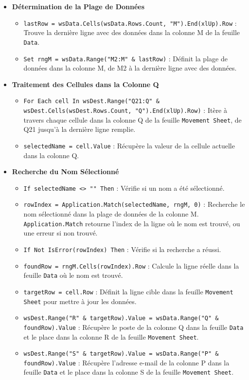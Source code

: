 \documentclass[a4paper, oneside, 12pt, final]{extreport}
\begin{document}
\begin{itemize}
    \item \textbf{Détermination de la Plage de Données}
    \begin{itemize}
        \item \texttt{lastRow = wsData.Cells(wsData.Rows.Count, "M").End(xlUp).Row} : Trouve la dernière ligne avec des données dans la colonne M de la feuille \texttt{Data}.
        \item \texttt{Set rngM = wsData.Range("M2:M" \& lastRow)} : Définit la plage de données dans la colonne M, de M2 à la dernière ligne avec des données.
    \end{itemize}

    \item \textbf{Traitement des Cellules dans la Colonne Q}
    \begin{itemize}
        \item \texttt{For Each cell In wsDest.Range("Q21:Q" \& wsDest.Cells(wsDest.Rows.Count, "Q").End(xlUp).Row)} : Itère à travers chaque cellule dans la colonne Q de la feuille \texttt{Movement Sheet}, de Q21 jusqu'à la dernière ligne remplie.
        \item \texttt{selectedName = cell.Value} : Récupère la valeur de la cellule actuelle dans la colonne Q.
    \end{itemize}

    \item \textbf{Recherche du Nom Sélectionné}
    \begin{itemize}
        \item \texttt{If selectedName <> "" Then} : Vérifie si un nom a été sélectionné.
        \item \texttt{rowIndex = Application.Match(selectedName, rngM, 0)} : Recherche le nom sélectionné dans la plage de données de la colonne M. \texttt{Application.Match} retourne l'index de la ligne où le nom est trouvé, ou une erreur si non trouvé.
        \item \texttt{If Not IsError(rowIndex) Then} : Vérifie si la recherche a réussi.
        \item \texttt{foundRow = rngM.Cells(rowIndex).Row} : Calcule la ligne réelle dans la feuille \texttt{Data} où le nom est trouvé.
        \item \texttt{targetRow = cell.Row} : Définit la ligne cible dans la feuille \texttt{Movement Sheet} pour mettre à jour les données.
        \item \texttt{wsDest.Range("R" \& targetRow).Value = wsData.Range("Q" \& foundRow).Value} : Récupère le poste de la colonne Q dans la feuille \texttt{Data} et le place dans la colonne R de la feuille \texttt{Movement Sheet}.
        \item \texttt{wsDest.Range("S" \& targetRow).Value = wsData.Range("P" \& foundRow).Value} : Récupère l'adresse e-mail de la colonne P dans la feuille \texttt{Data} et le place dans la colonne S de la feuille \texttt{Movement Sheet}.
    \end{itemize}


\end{itemize}
\end{document}
